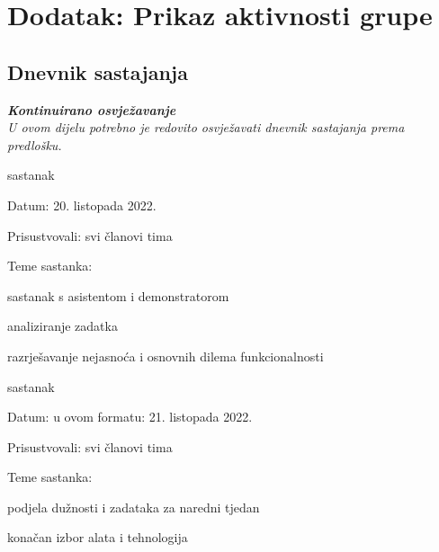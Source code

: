 \chapter*{Dodatak: Prikaz aktivnosti grupe}
		
		\section*{Dnevnik sastajanja}
		
		\textbf{\textit{Kontinuirano osvježavanje}}\\
		
		 \textit{U ovom dijelu potrebno je redovito osvježavati dnevnik sastajanja prema predlošku.}

  
		\begin{packed_enum}
			\item  sastanak
			
			\item[] \begin{packed_item}
				\item Datum: 20. listopada 2022.
				\item Prisustvovali: svi članovi tima
				\item Teme sastanka:
				\begin{packed_item}
					\item  sastanak s asistentom i demonstratorom
					\item  analiziranje zadatka
                        \item razrješavanje nejasnoća i osnovnih dilema funkcionalnosti
				\end{packed_item}
			\end{packed_item}
			
			\item  sastanak
			\item[] \begin{packed_item}
				\item Datum: u ovom formatu: 21. listopada 2022.
				\item Prisustvovali: svi članovi tima
				\item Teme sastanka:
				\begin{packed_item}
					\item  podjela dužnosti i zadataka za naredni tjedan
					\item  konačan izbor alata i tehnologija
				\end{packed_item}
			\end{packed_item}


\end{packed_enum}
